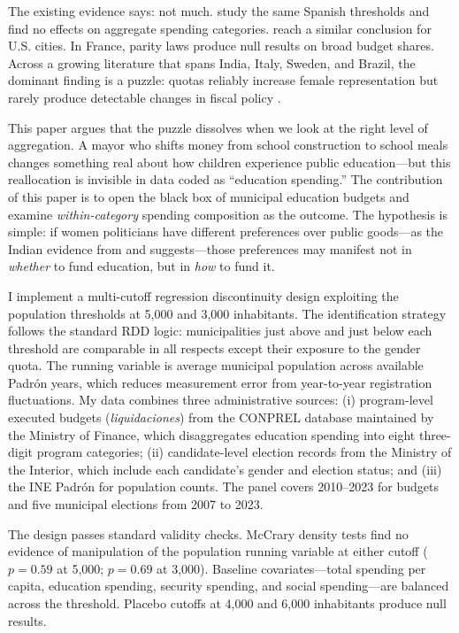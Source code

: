 \documentclass[12pt]{article}
\begin{document}
The existing evidence says: not much. \citet{bagues2021can} study the same Spanish thresholds and find no effects on aggregate spending categories. \citet{ferreira2014does} reach a similar conclusion for U.S. cities. In France, parity laws produce null results on broad budget shares. Across a growing literature that spans India, Italy, Sweden, and Brazil, the dominant finding is a puzzle: quotas reliably increase female representation but rarely produce detectable changes in fiscal policy \citep{baltrunaite2014quotas, besley2017gender, gagliarducci2013gender}.

This paper argues that the puzzle dissolves when we look at the right level of aggregation. A mayor who shifts money from school construction to school meals changes something real about how children experience public education---but this reallocation is invisible in data coded as ``education spending.'' The contribution of this paper is to open the black box of municipal education budgets and examine \emph{within-category} spending composition as the outcome. The hypothesis is simple: if women politicians have different preferences over public goods---as the Indian evidence from \citet{chattopadhyay2004women} and \citet{clots2012women} suggests---those preferences may manifest not in \emph{whether} to fund education, but in \emph{how} to fund it.

I implement a multi-cutoff regression discontinuity design exploiting the population thresholds at 5,000 and 3,000 inhabitants. The identification strategy follows the standard RDD logic: municipalities just above and just below each threshold are comparable in all respects except their exposure to the gender quota. The running variable is average municipal population across available Padr\'{o}n years, which reduces measurement error from year-to-year registration fluctuations. My data combines three administrative sources: (i) program-level executed budgets (\emph{liquidaciones}) from the CONPREL database maintained by the Ministry of Finance, which disaggregates education spending into eight three-digit program categories; (ii) candidate-level election records from the Ministry of the Interior, which include each candidate's gender and election status; and (iii) the INE Padr\'{o}n for population counts. The panel covers 2010--2023 for budgets and five municipal elections from 2007 to 2023.

The design passes standard validity checks. McCrary density tests find no evidence of manipulation of the population running variable at either cutoff ($p = 0.59$ at 5,000; $p = 0.69$ at 3,000). Baseline covariates---total spending per capita, education spending, security spending, and social spending---are balanced across the threshold. Placebo cutoffs at 4,000 and 6,000 inhabitants produce null results.
\end{document}
